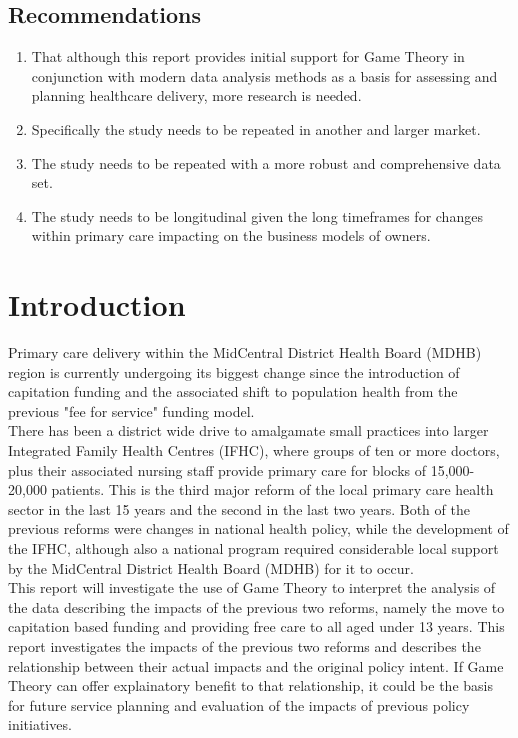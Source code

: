 \documentclass[11pt,a4paper]{article}
\begin{document}
\subsection{Recommendations}
 
\begin{enumerate}
\item That although this report provides initial support for Game Theory in conjunction with modern data analysis methods as a basis for assessing and planning healthcare delivery, more research is needed.
\item Specifically the study needs to be repeated in another and larger market.
\item The study needs to be repeated with a more robust and comprehensive data set.
\item The study needs to be longitudinal given the long timeframes for changes within primary care impacting on the business models of owners.
\end{enumerate}
\pagebreak

\tableofcontents

\pagebreak
\pagebreak

\listoffigures

\pagebreak
\section{Introduction}
Primary care delivery within the MidCentral District Health Board (MDHB) region is currently undergoing its biggest change since the introduction of capitation funding and the associated shift to population health from the previous "fee for service" funding model.\\

There has been a district wide drive to amalgamate small practices into larger Integrated Family Health Centres (IFHC), where groups of ten or more doctors, plus their associated nursing staff provide primary care for blocks of  15,000-20,000 patients. This is the third major reform of the local primary care health sector in the last 15 years and the second in the last two years. Both of the previous reforms were changes in national health policy, while the development of the IFHC, although also a national program required considerable local support by the MidCentral District Health Board (MDHB) for it to occur. \\

This report will investigate the use of Game Theory to interpret the analysis of the data describing the impacts of the previous two reforms, namely the move to capitation based funding and providing free care to all aged under 13 years. This report investigates the impacts of the previous two reforms and describes the relationship between their actual impacts and the original policy intent. If Game Theory can offer explainatory benefit to that relationship, it could be the basis for future service planning and evaluation of the impacts of previous policy initiatives.\\ 
\end{document}

